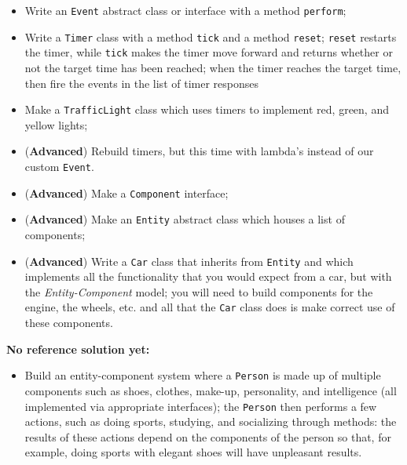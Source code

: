         \begin{itemize}
            \item Write an \texttt{Event} abstract class or interface with a method \texttt{perform};
            \item Write a \texttt{Timer} class with a method \texttt{tick} and a method \texttt{reset}; \texttt{reset} restarts the timer, while \texttt{tick} makes the timer move forward and returns whether or not the target time has been reached; when the timer reaches the target time, then fire the events in the list of timer responses
            \item Make a \texttt{TrafficLight} class which uses timers to implement red, green, and yellow lights;
            \item (\textbf{Advanced}) Rebuild timers, but this time with lambda's instead of our custom \texttt{Event}.
            \item (\textbf{Advanced}) Make a \texttt{Component} interface;
            \item (\textbf{Advanced}) Make an \texttt{Entity} abstract class which houses a list of components;
            \item (\textbf{Advanced}) Write a \texttt{Car} class that inherits from \texttt{Entity} and which implements all the functionality that you would expect from a car, but with the \textit{Entity-Component} model; you will need to build components for the engine, the wheels, etc. and all that the \texttt{Car} class does is make correct use of these components.
        \end{itemize}

        \textbf{No reference solution yet:}
        \begin{itemize}
            \item Build an entity-component system where a \texttt{Person} is made up of multiple components such as shoes, clothes, make-up, personality, and intelligence (all implemented via appropriate interfaces); the \texttt{Person} then performs a few actions, such as doing sports, studying, and socializing through methods: the results of these actions depend on the components of the person so that, for example, doing sports with elegant shoes will have unpleasant results.
        \end{itemize}

